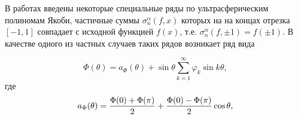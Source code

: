В работах \cite{shii1, shii2} введены некоторые специальные ряды по ультрасферическим полиномам Якоби, частичные суммы $\sigma_n^\alpha(f,x)$ которых на на концах отрезка $[-1,1]$ совпадает с исходной функцией $f(x)$, т.е. $\sigma_n^\alpha(f,\pm1)=f(\pm1)$.
В качестве одного из частных случаев таких рядов возникает ряд вида

\begin{equation}\label{ssap2deq.1.2.4.1.1}
 \Phi(\theta)=a_\Phi(\theta)+\sin\theta \sum_{k=1}^\infty\varphi_k\sin k \theta,
\end{equation}
где
$$
a_\Phi(\theta)={\Phi(0)+\Phi(\pi)\over2}+
{\Phi(0)-\Phi(\pi)\over2}\cos\theta,
$$


